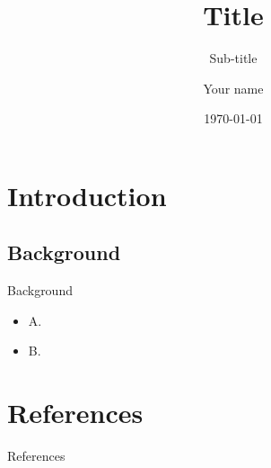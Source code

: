 \documentclass[aspectratio=169]{beamer}
\title{Title}
\subtitle{Sub-title}
\author{Your name}
\date{\today}
\institute{\url{https://robotics.umich.edu/}\\\url{your-email@umich.edu}}
\begin{document}
\begin{frame}[plain,t]
\titlepage
\end{frame}

\section{Introduction}
\subsection{Background}
{
\scriptsize %

\begin{frame}{Background}
    \begin{itemize}
        \item A.
        \item B.
        
    \end{itemize}
        \vfill

\end{frame}
}

\section{References}
\begin{frame}[allowframebreaks]{References}

\end{frame}

\ThankYouFrame
\end{document}

